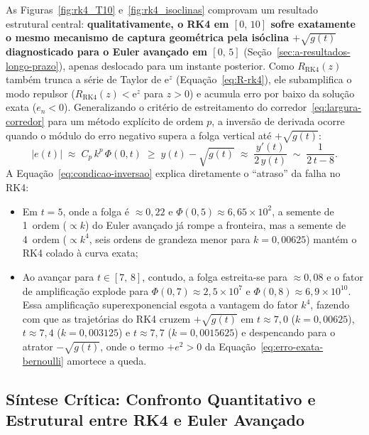 \documentclass[12pt, a4paper]{article}
\begin{document}
As Figuras~\ref{fig:rk4_T10} e~\ref{fig:rk4_isoclinas} comprovam um resultado estrutural central: \textbf{qualitativamente, o RK4 em $[0,\, 10]$ sofre exatamente o mesmo mecanismo de captura geométrica pela isóclina $+\sqrt{g(t)}$ diagnosticado para o Euler avançado em $[0,\, 5]$} (Seção~\ref{sec:a-resultados-longo-prazo}), apenas deslocado para um instante posterior. Como $R_{\text{RK4}}(z)$ também trunca a série de Taylor de $\mathrm{e}^z$ (Equação~\eqref{eq:R-rk4}), ele subamplifica o modo repulsor ($R_{\text{RK4}}(z) < \mathrm{e}^z$ para $z > 0$) e acumula erro por baixo da solução exata ($e_n < 0$). Generalizando o critério de estreitamento do corredor~\eqref{eq:largura-corredor} para um método explícito de ordem $p$, a inversão de derivada ocorre quando o módulo do erro negativo supera a folga vertical até $+\sqrt{g(t)}$:
\begin{equation}\label{eq:condicao-inversao}
  |e(t)| \;\approx\; C_p\,k^p\,\Phi(0, t) \;\ge\; y(t) - \sqrt{g(t)} \;\approx\; \frac{y'(t)}{2\,y(t)} \;\sim\; \frac{1}{2\,t - 8}.
\end{equation}
A Equação~\eqref{eq:condicao-inversao} explica diretamente o ``atraso'' da falha no RK4:
\begin{itemize}
    \item Em $t = 5$, onde a folga é $\approx 0{,}22$ e $\Phi(0, 5) \approx 6{,}65 \times 10^2$, a semente de 1\textordfeminine~ordem ($\propto k$) do Euler avançado já rompe a fronteira, mas a semente de 4\textordfeminine~ordem ($\propto k^4$, seis ordens de grandeza menor para $k = 0{,}00625$) mantém o RK4 colado à curva exata;
    \item Ao avançar para $t \in [7,\, 8]$, contudo, a folga estreita-se para $\approx 0{,}08$ e o fator de amplificação explode para $\Phi(0, 7) \approx 2{,}5 \times 10^7$ e $\Phi(0, 8) \approx 6{,}9 \times 10^{10}$. Essa amplificação superexponencial esgota a vantagem do fator $k^4$, fazendo com que as trajetórias do RK4 cruzem $+\sqrt{g(t)}$ em $t \approx 7{,}0$ ($k = 0{,}00625$), $t \approx 7{,}4$ ($k = 0{,}003125$) e $t \approx 7{,}7$ ($k = 0{,}0015625$) e despencando para o atrator $-\sqrt{g(t)}$, onde o termo $+e^2 > 0$ da Equação~\eqref{eq:erro-exata-bernoulli} amortece a queda.
\end{itemize}

\subsection{Síntese Crítica: Confronto Quantitativo e Estrutural entre RK4 e Euler Avançado}
\label{sec:b-sintese}
\end{document}
